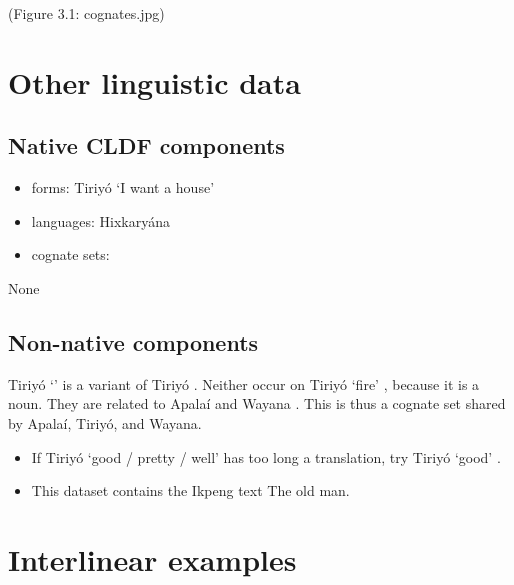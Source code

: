 \documentclass{article}
\begin{document}
(Figure 3.1: cognates.jpg)

\section{\texorpdfstring{Other linguistic data
\label{sec:data}}{Other linguistic data }}

\subsection{Native CLDF components}

\begin{itemize}
\tightlist
\item
  forms: Tiriyó  `I want a house'
  \parencites[417]{triomeira1999}
\item
  languages: Hixkaryána
\item
  cognate sets:
\end{itemize}

None

\subsection{Non-native components}

Tiriyó  `' \parencites[327]{triomeira1999} is a variant
of Tiriyó  \parencites[327]{triomeira1999}. Neither occur on
Tiriyó  `fire' \parencites[314]{triomeira1999}, because it is
a noun. They are related to Apalaí 
\parencites[77]{koehn1986apalai} and Wayana 
\parencites[236]{wayanatavares2005}. This is thus a cognate set shared
by Apalaí, Tiriyó, and Wayana.

\begin{itemize}
\item
  If Tiriyó  `good / pretty / well'
  \parencites[345]{triomeira1999} has too long a translation, try Tiriyó
   `good' \parencites[345]{triomeira1999}.
\item
  This dataset contains the Ikpeng text The old man.
\end{itemize}

\section{Interlinear examples}
\end{document}
